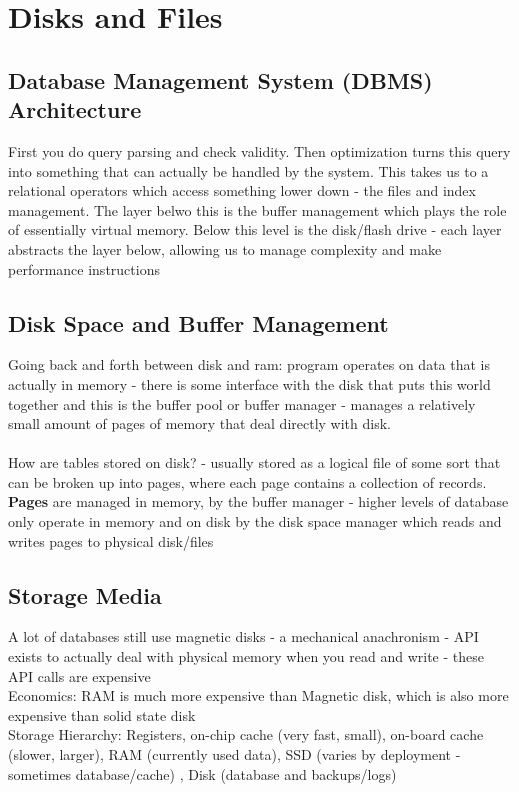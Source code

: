 \documentclass{article}
\begin{document}
\section{Disks and Files}
\subsection{Database Management System (DBMS) Architecture}
First you do query parsing and check validity. Then optimization turns this query into something that can actually be handled by the system. This takes us to a relational operators which access something lower down - the files and index management. The layer belwo this is the buffer management which plays the role of essentially virtual memory. Below this level is the disk/flash drive - each layer abstracts the layer below, allowing us to manage complexity and make performance instructions
\subsection{Disk Space and Buffer Management}
Going back and forth between disk and ram: program operates on data that is actually in memory - there is some interface with the disk that puts this world together and this is the buffer pool or buffer manager - manages a relatively small amount of pages of memory that deal directly with disk. \\  \\ 
How are tables stored on disk? - usually stored as a logical file of some sort that can be broken up into pages, where each page contains a collection of records. \\ 
\textbf{Pages} are managed in memory, by the buffer manager - higher levels of database only operate in memory and on disk by the disk space manager which reads and writes pages to physical disk/files
\subsection{Storage Media}
A lot of databases still use magnetic disks - a mechanical anachronism - API exists to actually deal with physical memory when you read and write - these API calls are expensive \\
Economics: RAM is much more expensive than Magnetic disk, which is also more expensive than solid state disk \\ 
Storage Hierarchy: Registers, on-chip cache (very fast, small), on-board cache (slower, larger), RAM (currently used data), SSD (varies by deployment - sometimes database/cache) , Disk (database and backups/logs)
\end{document}

